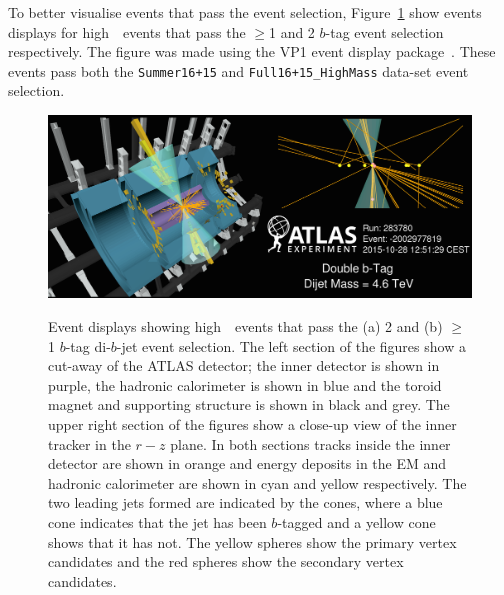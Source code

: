 To better visualise events that pass the event selection,
Figure~\ref{fig:evt-vp1} show events displays for high~\mjj~events that pass
the $\geq$1 and 2 $b$-tag event selection respectively.
The figure was made using the VP1 event display package~\cite{evt-vp1}.
These events pass both the \verb|Summer16+15| and \verb|Full16+15_HighMass| data-set event selection.

\begin{figure}[!ht]
  \begin{center}
    \captionsetup[subfigure]{aboveskip=0pt,justification=centering}
          {\includegraphics[width=0.95\linewidth, angle=0]{figs/Dibjet/Gen/evt-vp1_bb.png}}\\
  \end{center}
  \caption
      {Event displays showing high~\mjj~events that pass the (a) 2 and (b) $\geq$1 $b$-tag di-$b$-jet event selection.
        The left section of the figures show a cut-away of the ATLAS detector;
        the inner detector is shown in purple, the hadronic calorimeter is shown in blue
        and the toroid magnet and supporting structure is shown in black and grey.
        The upper right section of the figures show a close-up view of the inner tracker in the $r-z$ plane.
        In both sections tracks inside the inner detector are shown in orange
        and energy deposits in the EM and hadronic calorimeter are shown in cyan and yellow respectively.
        The two leading jets formed are indicated by the cones, where a blue cone indicates that the jet has been
        $b$-tagged and a yellow cone shows that it has not.
        The yellow spheres show the primary vertex candidates and the red spheres show the secondary vertex candidates.
      }
  \label{fig:evt-vp1}
\end{figure}

